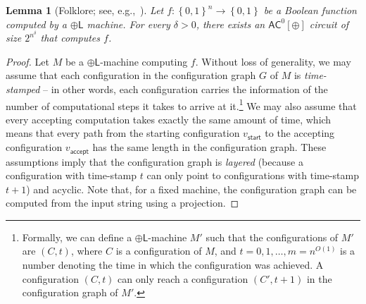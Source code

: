 \documentclass[10pt,a4paper]{article}
\newtheorem{lemma}[theorem]{Lemma}
\newcommand{\complexityfont}[1]{\mathsf{#1}}
\def\AC           {\complexityfont{AC}}
\def\pL           {\oplus\complexityfont{L}}
\newcommand{\set}[1]{\left\{#1\right\}}
\newcommand{\blt}{\set{0,1}}
\begin{document}
\begin{lemma}[Folklore; see, e.g.,~\cite{AKRRV01, DBLP:conf/coco/OliveiraS019}]
    \label{lemma:pl-to-ac02}
    Let $f : \blt^n \to \blt$
    be a Boolean function computed by
    a $\pL$ machine.
    For every $\delta > 0$,
    there exists an $\AC^0[\oplus]$ circuit
    of size $2^{n^\delta}$ that computes $f$.
\end{lemma}
\begin{proof}
    Let $M$ be a $\pL$-machine computing $f$.
    Without loss of generality, we may assume that
    each configuration in the 
    configuration graph $G$ of $M$
    is \emph{time-stamped} -- in other words,
    each configuration 
    carries the information of the number of
    computational steps it takes to arrive at it.\footnote{Formally,
        we can define a $\pL$-machine $M'$ such that
        the configurations of $M'$
        are
        $(C,t)$, where
        $C$ is a configuration of $M$, and $t = 0,1,\dots,m = n^{O(1)}$
        is a number denoting the time in which the configuration was
        achieved.
        A configuration $(C,t)$ can only reach a configuration
        $(C',t+1)$ in the configuration graph of $M'$.
    }
    We may also assume that
    every accepting computation takes exactly the same amount of time,
    which means that every path from the starting configuration
    $v_{\mathsf{start}}$
    to the accepting configuration
    $v_{\mathsf{accept}}$
    has the same length in the configuration graph.
    These assumptions imply that the configuration graph is \emph{layered} 
    (because a configuration with time-stamp $t$
        can only 
        point to
    configurations with time-stamp $t+1$)
    and acyclic.
    Note that, for a fixed machine,
    the configuration graph can be computed from the input string using a projection.  


\end{proof}
\end{document}
